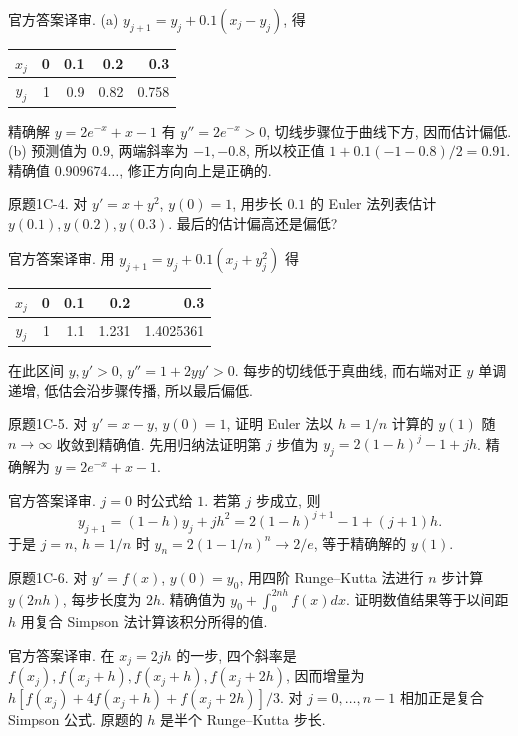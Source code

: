 \begin{solution}
官方答案译审. (a) $y_{j+1}=y_j+0.1(x_j-y_j)$, 得
\begin{center}\begin{tabular}{c|rrrr}$x_j$&0&0.1&0.2&0.3\\\hline$y_j$&1&0.9&0.82&0.758\end{tabular}\end{center}
精确解 $y=2e^{-x}+x-1$ 有 $y''=2e^{-x}>0$, 切线步骤位于曲线下方, 因而估计偏低. (b) 预测值为 $0.9$, 两端斜率为 $-1,-0.8$, 所以校正值 $1+0.1(-1-0.8)/2=0.91$. 精确值 $0.909674\ldots$, 修正方向向上是正确的.
\end{solution}
\begin{exercise}\label{cw:bank-1C-4}
原题1C-4. 对 $y'=x+y^2$, $y(0)=1$, 用步长 $0.1$ 的 Euler 法列表估计 $y(0.1),y(0.2),y(0.3)$. 最后的估计偏高还是偏低?
\end{exercise}
\begin{solution}
官方答案译审. 用 $y_{j+1}=y_j+0.1(x_j+y_j^2)$ 得
\begin{center}\begin{tabular}{c|rrrr}$x_j$&0&0.1&0.2&0.3\\\hline$y_j$&1&1.1&1.231&1.4025361\end{tabular}\end{center}
在此区间 $y,y'>0$, $y''=1+2yy'>0$. 每步的切线低于真曲线, 而右端对正 $y$ 单调递增, 低估会沿步骤传播, 所以最后偏低.
\end{solution}
\begin{exercise}\label{cw:bank-1C-5}
原题1C-5. 对 $y'=x-y$, $y(0)=1$, 证明 Euler 法以 $h=1/n$ 计算的 $y(1)$ 随 $n\to\infty$ 收敛到精确值. 先用归纳法证明第 $j$ 步值为 $y_j=2(1-h)^j-1+jh$. 精确解为 $y=2e^{-x}+x-1$.
\end{exercise}
\begin{solution}
官方答案译审. $j=0$ 时公式给 $1$. 若第 $j$ 步成立, 则
\[
 y_{j+1}=(1-h)y_j+jh^2=2(1-h)^{j+1}-1+(j+1)h.
\]
于是 $j=n$, $h=1/n$ 时 $y_n=2(1-1/n)^n\to2/e$, 等于精确解的 $y(1)$.
\end{solution}
\begin{exercise}\label{cw:bank-1C-6}
原题1C-6. 对 $y'=f(x)$, $y(0)=y_0$, 用四阶 Runge--Kutta 法进行 $n$ 步计算 $y(2nh)$, 每步长度为 $2h$. 精确值为 $y_0+\int_0^{2nh}f(x)dx$. 证明数值结果等于以间距 $h$ 用复合 Simpson 法计算该积分所得的值.
\end{exercise}
\begin{solution}
官方答案译审. 在 $x_j=2jh$ 的一步, 四个斜率是 $f(x_j),f(x_j+h),f(x_j+h),f(x_j+2h)$, 因而增量为 $h[f(x_j)+4f(x_j+h)+f(x_j+2h)]/3$. 对 $j=0,\ldots,n-1$ 相加正是复合 Simpson 公式. 原题的 $h$ 是半个 Runge--Kutta 步长.
\end{solution}
